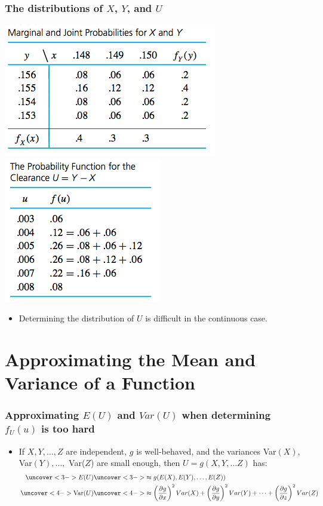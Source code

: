 \documentclass[handout]{beamer}\usepackage{graphicx, color}
\numberwithin{equation}{section}
\begin{document}
\begin{frame}
\frametitle{The distributions of $X$, $Y$, and $U$}
 \includegraphics{../../fig/platexy.png}
 \includegraphics{../../fig/plateu.png}
\begin{itemize}
\pause \item Determining the distribution of $U$ is difficult in the continuous case.
\end{itemize}
\end{frame}


\section{Approximating the Mean and Variance of a Function}

\begin{frame}
\frametitle{\small Approximating $E(U)$ and $Var(U)$ when determining $f_U(u)$ is too hard} \scriptsize
\begin{itemize}
\pause \item If $X, Y, \ldots, Z$ are independent, $g$ is well-behaved, and the variances Var$(X)$, Var$(Y), \ldots,$ Var($Z$) are small enough, then $U = g(X, Y, \ldots Z)$ has:
\begin{align*}
\uncover<3->{E(U)} &\uncover<3->{\approx g(E(X), E(Y), \ldots, E(Z))} \\
\uncover<4->{\text{Var}(U)} & \uncover<4->{\approx \left ( \frac{\partial g}{\partial x}\right )^2 Var(X) + \left ( \frac{\partial g}{\partial y}\right )^2 Var(Y) + \cdots + \left ( \frac{\partial g}{\partial z}\right )^2 Var(Z)}
\end{align*}
\end{itemize}
\end{frame}
\end{document}
